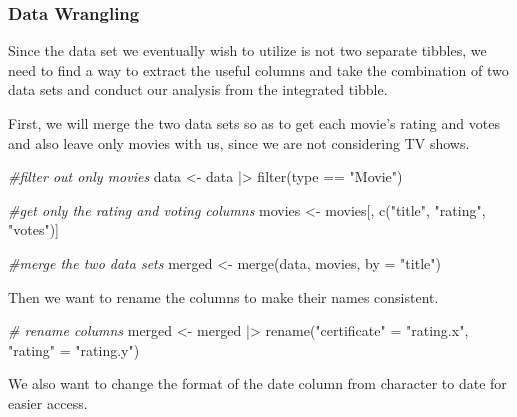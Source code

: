 \documentclass[
]{article}
\newenvironment{Shaded}{\begin{snugshade}}{\end{snugshade}}
\newcommand{\AttributeTok}[1]{\textcolor[rgb]{0.77,0.63,0.00}{#1}}
\newcommand{\CommentTok}[1]{\textcolor[rgb]{0.56,0.35,0.01}{\textit{#1}}}
\newcommand{\FunctionTok}[1]{\textcolor[rgb]{0.00,0.00,0.00}{#1}}
\newcommand{\NormalTok}[1]{#1}
\newcommand{\OtherTok}[1]{\textcolor[rgb]{0.56,0.35,0.01}{#1}}
\newcommand{\SpecialCharTok}[1]{\textcolor[rgb]{0.00,0.00,0.00}{#1}}
\newcommand{\StringTok}[1]{\textcolor[rgb]{0.31,0.60,0.02}{#1}}
\begin{document}
\hypertarget{data-wrangling}{%
\subsubsection{Data Wrangling}\label{data-wrangling}}

Since the data set we eventually wish to utilize is not two separate
tibbles, we need to find a way to extract the useful columns and take
the combination of two data sets and conduct our analysis from the
integrated tibble.

First, we will merge the two data sets so as to get each movie's rating
and votes and also leave only movies with us, since we are not
considering TV shows.

\begin{Shaded}
\begin{Highlighting}[]
\CommentTok{\#filter out only movies}
\NormalTok{data }\OtherTok{\textless{}{-}}\NormalTok{ data }\SpecialCharTok{|\textgreater{}} \FunctionTok{filter}\NormalTok{(type }\SpecialCharTok{==} \StringTok{"Movie"}\NormalTok{)}

\CommentTok{\#get only the rating and voting columns}
\NormalTok{movies }\OtherTok{\textless{}{-}}\NormalTok{ movies[, }\FunctionTok{c}\NormalTok{(}\StringTok{"title"}\NormalTok{, }\StringTok{"rating"}\NormalTok{, }\StringTok{"votes"}\NormalTok{)]}

\CommentTok{\#merge the two data sets}
\NormalTok{merged }\OtherTok{\textless{}{-}} \FunctionTok{merge}\NormalTok{(data, movies, }\AttributeTok{by =} \StringTok{"title"}\NormalTok{)}
\end{Highlighting}
\end{Shaded}

Then we want to rename the columns to make their names consistent.

\begin{Shaded}
\begin{Highlighting}[]
\CommentTok{\# rename columns}
\NormalTok{merged }\OtherTok{\textless{}{-}}\NormalTok{ merged }\SpecialCharTok{|\textgreater{}}
  \FunctionTok{rename}\NormalTok{(}\StringTok{"certificate"} \OtherTok{=} \StringTok{"rating.x"}\NormalTok{,}
         \StringTok{"rating"} \OtherTok{=} \StringTok{"rating.y"}\NormalTok{)}
\end{Highlighting}
\end{Shaded}

We also want to change the format of the date column from character to
date for easier access.

\begin{Shaded}
\end{Shaded}
\end{document}
